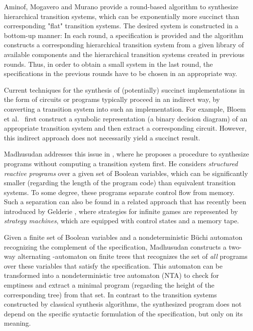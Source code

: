 \documentclass[submission,copyright,creativecommons]{eptcs}
\begin{document}
Aminof, Mogavero and Murano \cite{aminof_synthesis_2012} provide a
round-based algorithm to synthesize hierarchical transition systems, which can be
exponentially more succinct than corresponding "flat" transition systems.
The desired system is constructed in a bottom-up manner:
In each round, a specification is provided and the algorithm constructs a
corresponding hierarchical transition system from a given library of available
components and the hierarchical
transition systems created in previous rounds.
Thus, in order to obtain a small system in the last
round, the specifications in the previous rounds have to be chosen in an
appropriate way.

Current techniques for the synthesis of (potentially) succinct implementations in the form
of circuits or programs typically proceed in an
indirect way, by converting a transition system into such an implementation.
For example, Bloem et al.\ \cite{Bloem20073}
first construct a symbolic representation (a binary decision diagram) of an
appropriate transition system and then extract a corresponding circuit.
However, this indirect approach does not necessarily yield a succinct result.

Madhusudan addresses this issue in \cite{madhusudan:LIPIcs:2011:3247}, where
he proposes a procedure to synthesize programs
without computing a transition system first. He considers
\emph{structured reactive programs} over a given set of Boolean variables,
which can be significantly smaller (regarding the length of the
program code) than equivalent transition systems.
To some degree, these programs separate control flow
from memory.
Such a separation can also be found in a related approach that has recently
been introduced by Gelderie \cite{Gelderie12}, where strategies for
infinite games are represented by \emph{strategy machines}, which are
equipped with control states and a memory tape.

Given a finite set of Boolean variables and a nondeterministic Büchi automaton
recognizing the complement of the specification,
Madhusudan constructs a two-way
alternating -automaton on finite trees that recognizes the set of
\emph{all} programs over these variables that satisfy the specification.
This automaton can be transformed into a nondeterministic tree automaton (NTA)
to check for emptiness and extract a minimal program
(regarding the height of the corresponding tree) from that set.
In contrast to the transition systems constructed by classical synthesis
algorithms, the synthesized program does not depend on the specific syntactic
formulation of the specification, but only on its meaning.
\end{document}
